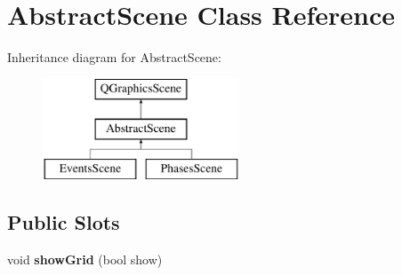 \hypertarget{class_abstract_scene}{\section{Abstract\-Scene Class Reference}
\label{class_abstract_scene}
}
Inheritance diagram for Abstract\-Scene\-:\begin{figure}[H]
\begin{center}
\leavevmode
\includegraphics[height=3.000000cm]{class_abstract_scene}
\end{center}
\end{figure}
\subsection*{Public Slots}
\begin{DoxyCompactItemize}
\item 
\hypertarget{class_abstract_scene_ac932d36fb77cab5cc7956e118fee53ea}{void {\bfseries show\-Grid} (bool show)}\label{class_abstract_scene_ac932d36fb77cab5cc7956e118fee53ea}

\end{DoxyCompactItemize}
